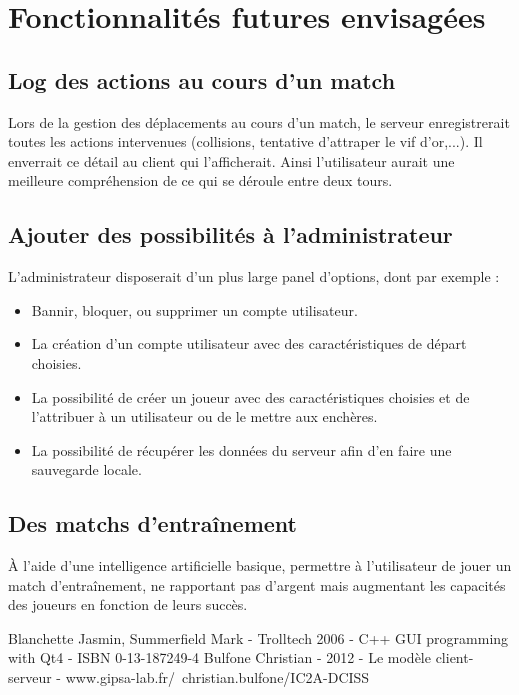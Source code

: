 \documentclass[a4paper,titlepage]{scrreprt}
\begin{document}
\section{Fonctionnalités futures envisagées}
  \subsection{Log des actions au cours d'un match}
    Lors de la gestion des déplacements au cours d'un match, le serveur enregistrerait 
    toutes les actions intervenues (collisions, tentative d'attraper le vif d'or,...).
    Il enverrait ce détail au client qui l'afficherait. Ainsi l'utilisateur aurait une
    meilleure compréhension de ce qui se déroule entre deux tours.
  \subsection{Ajouter des possibilités à l'administrateur}
    L'administrateur disposerait d'un plus large panel d'options, dont par exemple :
    \begin{itemize}
      \item Bannir, bloquer, ou supprimer un compte utilisateur.
      \item La création d'un compte utilisateur avec des caractéristiques de départ choisies.
      \item La possibilité de créer un joueur avec des caractéristiques choisies 
        et de l'attribuer à un utilisateur ou de le mettre aux enchères.
      \item La possibilité de récupérer les données du serveur afin d'en faire une sauvegarde locale.
    \end{itemize}
  \subsection{Des matchs d’entraînement}
    À l'aide d'une intelligence artificielle basique, permettre à l'utilisateur
    de jouer un match d'entraînement, ne rapportant pas d'argent mais
    augmentant les capacités des joueurs en fonction de leurs succès.
    
  


\begin{thebibliography}{9}
 Blanchette Jasmin, Summerfield Mark - Trolltech 2006 - C++ GUI programming with Qt4 - ISBN 0-13-187249-4
 Bulfone Christian - 2012 - Le modèle client-serveur - www.gipsa-lab.fr/~christian.bulfone/IC2A-DCISS
\end{thebibliography}
\printindex
\end{document}
